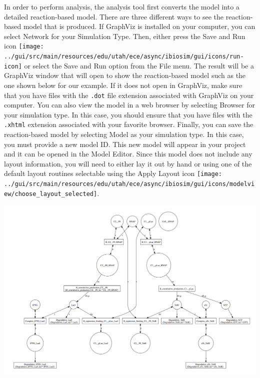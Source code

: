 \documentclass[titlepage,11pt]{article}
\begin{document}
In order to perform analysis, the analysis tool first converts the model into a detailed reaction-based model.  There are three different ways to see the reaction-based model that is produced.  If GraphViz is installed on your computer, you can select Network for your Simulation Type.  Then, either press the Save and Run icon \texttt{[image: ../gui/src/main/resources/edu/utah/ece/async/ibiosim/gui/icons/run-icon]} or select the Save and Run option from the File menu.  The result will be a GraphViz window that will open to show the reaction-based model such as the one shown below for our example.  If it does not open in GraphViz, make sure that you have files with the {\tt .dot} file extension associated with GraphViz on your computer.  You can also view the model in a web browser by selecting Browser for your simulation type.  In this case, you should ensure that you have files with the {\tt .xhtml} extension associated with your favorite browser.  Finally, you can save the reaction-based model by selecting Model as your simulation type.  In this case, you must provide a new model ID.  This new model will appear in your project and it can be opened in the Model Editor.  Since this model does not include any layout information, you will need to either lay it out by hand or using one of the default layout routines selectable using the Apply Layout icon    \texttt{[image: ../gui/src/main/resources/edu/utah/ece/async/ibiosim/gui/icons/modelview/choose\_layout\_selected]}.

\begin{center}
\includegraphics[width=160mm]{screenshots/viewNetworkGT}
\end{center}
\end{document}
